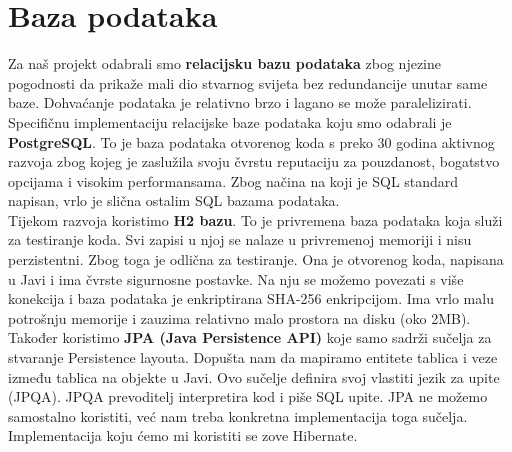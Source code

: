 		\section{Baza podataka}
			
		Za naš projekt odabrali smo \textbf{relacijsku bazu podataka} zbog njezine pogodnosti da prikaže mali dio stvarnog svijeta bez redundancije unutar same baze. Dohvaćanje podataka je relativno brzo i lagano se može paralelizirati. Specifičnu implementaciju relacijske baze podataka koju smo odabrali je \textbf{PostgreSQL}. To je baza podataka otvorenog koda s preko 30 godina aktivnog razvoja zbog kojeg je zaslužila svoju čvrstu reputaciju za pouzdanost, bogatstvo opcijama i visokim performansama. Zbog načina na koji je SQL standard napisan, vrlo je slična ostalim SQL bazama podataka.\\ 
		
		Tijekom razvoja koristimo \textbf{H2 bazu}. To je privremena baza podataka koja služi za testiranje koda. Svi zapisi u njoj se nalaze u privremenoj memoriji i nisu perzistentni. Zbog toga je odlična za testiranje. Ona je otvorenog koda, napisana u Javi i ima čvrste sigurnosne postavke. Na nju se možemo povezati s više konekcija i baza podataka je enkriptirana SHA-256 enkripcijom. Ima vrlo malu potrošnju memorije i zauzima relativno malo prostora na disku (oko 2MB). \\ 
		
		Također koristimo \textbf{JPA (Java Persistence API)} koje samo sadrži sučelja za stvaranje Persistence layouta. Dopušta nam da mapiramo entitete tablica i veze između tablica na objekte u Javi. Ovo sučelje definira svoj vlastiti jezik za upite (JPQA). JPQA prevoditelj interpretira kod i piše SQL upite. JPA ne možemo samostalno koristiti, već nam treba konkretna implementacija toga sučelja. Implementacija koju ćemo mi koristiti se zove Hibernate. \\ 
		
